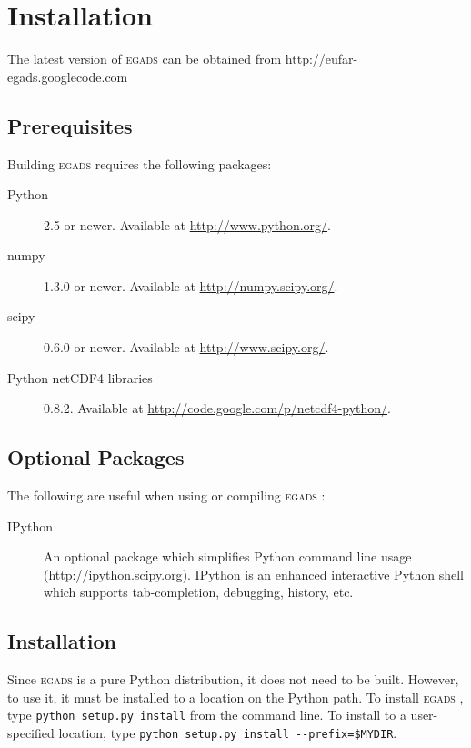 \documentclass[a4paper,11pt]{report}
\newcommand{\egads}{\textsc{egads} }
\begin{document}
\chapter{Installation}

The latest version of \egads can be obtained from http://eufar-egads.googlecode.com

\section{Prerequisites}

Building \egads requires the following packages:

\begin{description}
 \item[Python] 2.5 or newer. Available at \href{http://www.python.org/}{http://www.python.org/}.
 \item[numpy] 1.3.0 or newer. Available at \href{http://numpy.scipy.org/}{http://numpy.scipy.org/}.
 \item[scipy] 0.6.0 or newer. Available at \href{http://www.scipy.org/}{http://www.scipy.org/}.
 \item[Python netCDF4 libraries] 0.8.2. Available at \href{http://code.google.com/p/netcdf4-python/}{http://code.google.com/p/netcdf4-python/}.

\end{description}

\section{Optional Packages}

The following are useful when using or compiling \egads:

\begin{description}
 \item[IPython] An optional package which simplifies Python command line usage 
(\href{http://ipython.scipy.org}{http://ipython.scipy.org}). IPython is an enhanced interactive Python 
shell which supports tab-completion, debugging, history, etc. 

 \end{description}

\section{Installation}
Since \egads is a pure Python distribution, it does not need to be built. However, to use it, it must 
be installed to a location on the Python path. To install \egads, type \verb|python setup.py install| 
from the command line. To install to a user-specified location, type 
\verb|python setup.py install --prefix=$MYDIR|. 
\end{document}
